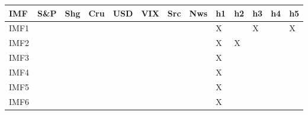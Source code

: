 {\tiny\setlength{\tabcolsep}{1pt}\begin{tabular}{lllllllllllll} \toprule
IMF & S\&P & Shg & Cru & USD & VIX & Src & Nws & h1 & h2 & h3 & h4 & h5 \\ \midrule
IMF1 & & & & & & & & X & & X & & X \\ 
IMF2 & & & & & & & & X & X & & & \\ 
IMF3 & & & & & & & & X & & & & \\ 
IMF4 & & & & & & & & X & & & & \\ 
IMF5 & & & & & & & & X & & & & \\ 
IMF6 & & & & & & & & X & & & & \\ 
\bottomrule \end{tabular}}
